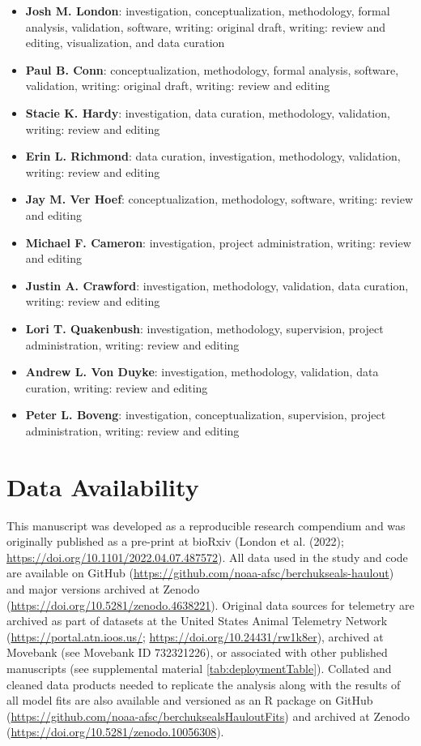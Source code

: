 \documentclass[fleqn,10pt,lineno]{wlpeerj} %
\providecommand{\tightlist}{%
  \setlength{\itemsep}{0pt}\setlength{\parskip}{0pt}}
\begin{document}
\begin{itemize}
\tightlist
\item
  \textbf{Josh M. London}: investigation, conceptualization, methodology,
  formal analysis, validation, software, writing: original draft, writing:
  review and editing, visualization, and data curation
\item
  \textbf{Paul B. Conn}: conceptualization, methodology, formal analysis,
  software, validation, writing: original draft, writing: review and
  editing
\item
  \textbf{Stacie K. Hardy}: investigation, data curation, methodology,
  validation, writing: review and editing
\item
  \textbf{Erin L. Richmond}: data curation, investigation, methodology,
  validation, writing: review and editing
\item
  \textbf{Jay M. Ver Hoef}: conceptualization, methodology, software, writing:
  review and editing
\item
  \textbf{Michael F. Cameron}: investigation, project administration, writing:
  review and editing
\item
  \textbf{Justin A. Crawford}: investigation, methodology, validation, data curation,
  writing: review and editing
\item
  \textbf{Lori T. Quakenbush}: investigation, methodology, supervision, project
  administration, writing: review and editing
\item
  \textbf{Andrew L. Von Duyke}: investigation, methodology, validation, data curation,
  writing: review and editing
\item
  \textbf{Peter L. Boveng}: investigation, conceptualization, supervision,
  project administration, writing: review and editing
\end{itemize}

\section*{Data Availability}\label{data-availability}

This manuscript was developed as a reproducible research compendium and was
originally published as a pre-print at bioRxiv (London et al. (2022);
\url{https://doi.org/10.1101/2022.04.07.487572}). All data used in the study and code
are available on GitHub (\url{https://github.com/noaa-afsc/berchukseals-haulout}) and
major versions archived at Zenodo (\url{https://doi.org/10.5281/zenodo.4638221}).
Original data sources for telemetry are archived as part of datasets at
the United States Animal Telemetry Network (\url{https://portal.atn.ioos.us/};
\url{https://doi.org/10.24431/rw1k8er}), archived at Movebank (see
Movebank ID 732321226), or associated
with other published manuscripts (see supplemental material
\ref{tab:deploymentTable}). Collated and cleaned data products needed to
replicate the analysis along with the results of all model fits are also
available and versioned as an R package on GitHub
(\url{https://github.com/noaa-afsc/berchuksealsHauloutFits}) and archived at Zenodo
(\url{https://doi.org/10.5281/zenodo.10056308}).
\end{document}
